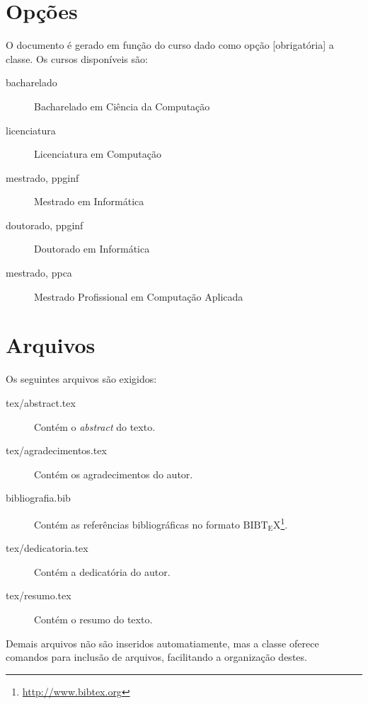 \section{Opções}
O documento é gerado em função do curso dado como opção [obrigatória] a classe. 
Os cursos disponíveis são:
\begin{description}
  \item[bacharelado] Bacharelado em Ciência da Computação
  \item[licenciatura] Licenciatura em Computação
  \item[mestrado, ppginf] Mestrado em Informática
  \item[doutorado, ppginf] Doutorado em Informática
  \item[mestrado, ppca] Mestrado Profissional em Computação Aplicada
\end{description}



\section{Arquivos}
Os seguintes arquivos são exigidos:
\begin{description}%
    \item[tex/abstract.tex] Contém o \emph{abstract} do texto.%
    \item[tex/agradecimentos.tex] Contém os agradecimentos do autor.%
    \item[bibliografia.bib] Contém as referências bibliográficas no formato 
    ${\mathrm{B{\scriptstyle{IB}}T_{\displaystyle E}X}}$\footnote{\url{http://www.bibtex.org}}.%
    \item[tex/dedicatoria.tex] Contém a dedicatória do autor.%
    \item[tex/resumo.tex] Contém o resumo do texto.%
\end{description}%

Demais arquivos não são inseridos automatiamente, mas a classe oferece comandos 
para inclusão de arquivos, facilitando a organização destes.



